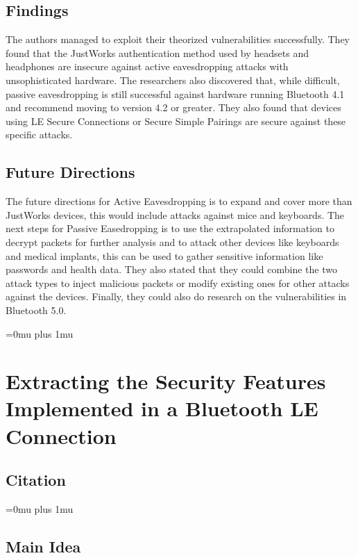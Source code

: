 \documentclass[letterpaper,12pt]{article}
\begin{document}
\subsection{Findings}

\noindent
The authors managed to exploit their theorized vulnerabilities successfully.  They found that the JustWorks authentication method used by headsets and headphones are insecure against active eavesdropping attacks with unsophisticated hardware.  The researchers also discovered that, while difficult, passive eavesdropping is still successful against hardware running Bluetooth 4.1 and recommend moving to version 4.2 or greater.  They also found that devices using LE Secure Connections or Secure Simple Pairings are secure against these specific attacks.

\subsection{Future Directions}

\noindent
The future directions for Active Eavesdropping is to expand and cover more than JustWorks devices, this would include attacks against mice and keyboards.  The next steps for Passive Easedropping is to use the extrapolated information to decrypt packets for further analysis and to attack other devices like keyboards and medical implants, this can be used to gather sensitive information like passwords and health data.  They also stated that they could combine the two attack types to inject malicious packets or modify existing ones for other attacks against the devices.  Finally, they could also do research on the vulnerabilities in Bluetooth 5.0.

\Urlmuskip=0mu plus 1mu\relax

\section{Extracting the Security Features Implemented in a Bluetooth LE Connection}


\noindent
\subsection{Citation}

\Urlmuskip=0mu plus 1mu\relax
{}

\subsection{Main Idea}
\end{document}
